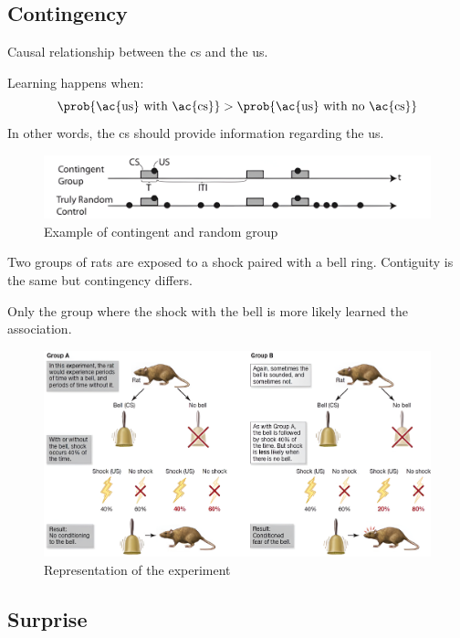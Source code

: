 \subsection{Contingency}

Causal relationship between the \acl{cs} and the \acl{us}.

\begin{remark}
    Learning happens when:
    \[ \prob{\text{\ac{us} with \ac{cs}}} > \prob{\text{\ac{us} with no \ac{cs}}} \]
    In other words, the \ac{cs} should provide information regarding the \ac{us}.
\end{remark}

\begin{figure}[H]
    \centering
    \includegraphics[width=0.6\linewidth]{./img/contingency.png}
    \caption{Example of contingent and random group}
\end{figure}

\begin{casestudy}
    Two groups of rats are exposed to a shock paired with a bell ring.
    Contiguity is the same but contingency differs.

    Only the group where the shock with the bell is more likely learned the association.

    \begin{figure}[H]
        \centering
        \includegraphics[width=0.8\linewidth]{./img/contingency_rats.png}
        \caption{Representation of the experiment}
    \end{figure}
\end{casestudy}


\subsection{Surprise}

